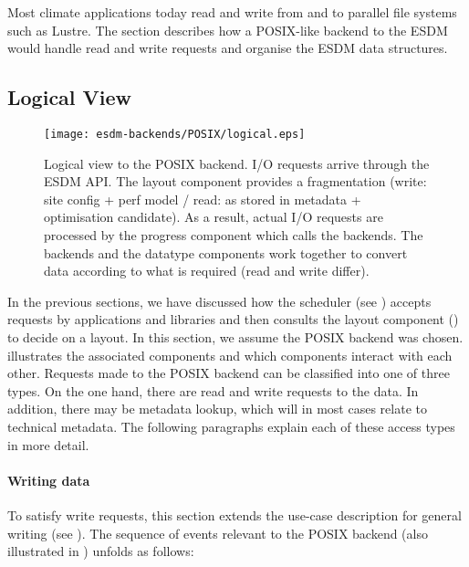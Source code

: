
Most climate applications today read and write from and to parallel file systems such as Lustre.
The section describes how a POSIX-like backend to the ESDM would handle read and write requests and organise the ESDM data structures.


\subsection{Logical View}
\label{backend: posix/logical}

\begin{figure}
	\centering
	\texttt{[image: esdm-backends/POSIX/logical.eps]}
	\caption{Logical view to the POSIX backend. I/O requests arrive through the ESDM API. The layout component provides a fragmentation (write: site config + perf model / read: as stored in metadata + optimisation candidate). As a result, actual I/O requests are processed by the progress component which calls the backends. The backends and the datatype components work together to convert data according to what is required (read and write differ).}
	\label{fig:backend posix logical view}
\end{figure}

In the previous sections, we have discussed how the scheduler (see ) accepts requests by applications and libraries and then consults the layout component () to decide on a layout.
In this section, we assume the POSIX backend was chosen.
 illustrates the associated components and which components interact with each other.
Requests made to the POSIX backend can be classified into one of three types.
On the one hand, there are read and write requests to the data.
In addition, there may be metadata lookup, which will in most cases relate to technical metadata.
The following paragraphs explain each of these access types in more detail.


\paragraph{Writing data}
To satisfy write requests, this section extends the use-case description for general writing (see ).
The sequence of events relevant to the POSIX backend (also illustrated in ) unfolds as follows:

